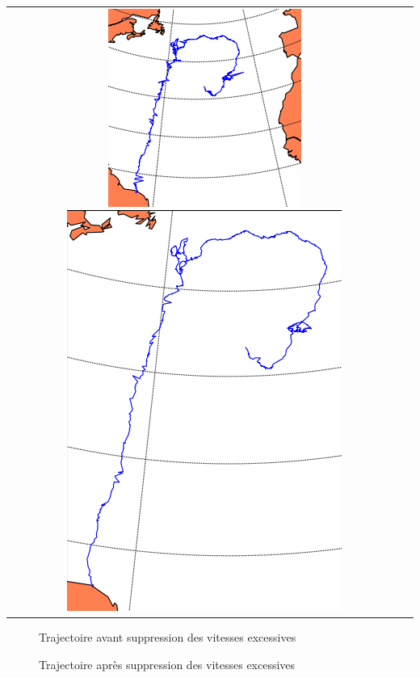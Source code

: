 \documentclass[11p, a4papert]{article}
\begin{document}
\begin{tabular}{cc}
   \includegraphics[scale=0.85]{avecCorrecDistance.png}
   \includegraphics[scale=0.45]{avecVitEx.png}
\end{tabular}
\begin{figure}
 \begin{minipage}[b]{.46\linewidth}

  \caption{Trajectoire avant suppression des vitesses excessives \label{fig1}}
 \end{minipage} \hfill
 \begin{minipage}[b]{.46\linewidth}
  
  \caption{Trajectoire après suppression des vitesses excessives \label{fig2}}
 \end{minipage}
\end{figure}
\newline
\newline
\newline
\end{document}
